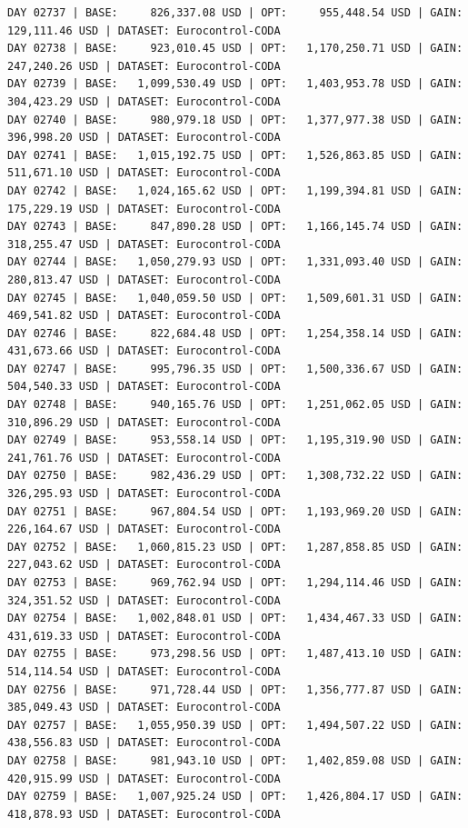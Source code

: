 \documentclass[11pt,a4paper]{article}
\begin{document}
\begin{verbatim}
DAY 02737 | BASE:     826,337.08 USD | OPT:     955,448.54 USD | GAIN: 129,111.46 USD | DATASET: Eurocontrol-CODA
DAY 02738 | BASE:     923,010.45 USD | OPT:   1,170,250.71 USD | GAIN: 247,240.26 USD | DATASET: Eurocontrol-CODA
DAY 02739 | BASE:   1,099,530.49 USD | OPT:   1,403,953.78 USD | GAIN: 304,423.29 USD | DATASET: Eurocontrol-CODA
DAY 02740 | BASE:     980,979.18 USD | OPT:   1,377,977.38 USD | GAIN: 396,998.20 USD | DATASET: Eurocontrol-CODA
DAY 02741 | BASE:   1,015,192.75 USD | OPT:   1,526,863.85 USD | GAIN: 511,671.10 USD | DATASET: Eurocontrol-CODA
DAY 02742 | BASE:   1,024,165.62 USD | OPT:   1,199,394.81 USD | GAIN: 175,229.19 USD | DATASET: Eurocontrol-CODA
DAY 02743 | BASE:     847,890.28 USD | OPT:   1,166,145.74 USD | GAIN: 318,255.47 USD | DATASET: Eurocontrol-CODA
DAY 02744 | BASE:   1,050,279.93 USD | OPT:   1,331,093.40 USD | GAIN: 280,813.47 USD | DATASET: Eurocontrol-CODA
DAY 02745 | BASE:   1,040,059.50 USD | OPT:   1,509,601.31 USD | GAIN: 469,541.82 USD | DATASET: Eurocontrol-CODA
DAY 02746 | BASE:     822,684.48 USD | OPT:   1,254,358.14 USD | GAIN: 431,673.66 USD | DATASET: Eurocontrol-CODA
DAY 02747 | BASE:     995,796.35 USD | OPT:   1,500,336.67 USD | GAIN: 504,540.33 USD | DATASET: Eurocontrol-CODA
DAY 02748 | BASE:     940,165.76 USD | OPT:   1,251,062.05 USD | GAIN: 310,896.29 USD | DATASET: Eurocontrol-CODA
DAY 02749 | BASE:     953,558.14 USD | OPT:   1,195,319.90 USD | GAIN: 241,761.76 USD | DATASET: Eurocontrol-CODA
DAY 02750 | BASE:     982,436.29 USD | OPT:   1,308,732.22 USD | GAIN: 326,295.93 USD | DATASET: Eurocontrol-CODA
DAY 02751 | BASE:     967,804.54 USD | OPT:   1,193,969.20 USD | GAIN: 226,164.67 USD | DATASET: Eurocontrol-CODA
DAY 02752 | BASE:   1,060,815.23 USD | OPT:   1,287,858.85 USD | GAIN: 227,043.62 USD | DATASET: Eurocontrol-CODA
DAY 02753 | BASE:     969,762.94 USD | OPT:   1,294,114.46 USD | GAIN: 324,351.52 USD | DATASET: Eurocontrol-CODA
DAY 02754 | BASE:   1,002,848.01 USD | OPT:   1,434,467.33 USD | GAIN: 431,619.33 USD | DATASET: Eurocontrol-CODA
DAY 02755 | BASE:     973,298.56 USD | OPT:   1,487,413.10 USD | GAIN: 514,114.54 USD | DATASET: Eurocontrol-CODA
DAY 02756 | BASE:     971,728.44 USD | OPT:   1,356,777.87 USD | GAIN: 385,049.43 USD | DATASET: Eurocontrol-CODA
DAY 02757 | BASE:   1,055,950.39 USD | OPT:   1,494,507.22 USD | GAIN: 438,556.83 USD | DATASET: Eurocontrol-CODA
DAY 02758 | BASE:     981,943.10 USD | OPT:   1,402,859.08 USD | GAIN: 420,915.99 USD | DATASET: Eurocontrol-CODA
DAY 02759 | BASE:   1,007,925.24 USD | OPT:   1,426,804.17 USD | GAIN: 418,878.93 USD | DATASET: Eurocontrol-CODA

\end{verbatim}
\end{document}
